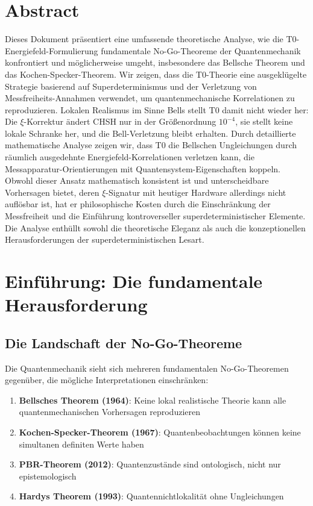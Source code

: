 \section*{Abstract}
		Dieses Dokument präsentiert eine umfassende theoretische Analyse, wie die T0-Energiefeld-Formulierung fundamentale No-Go-Theoreme der Quantenmechanik konfrontiert und möglicherweise umgeht, insbesondere das Bellsche Theorem und das Kochen-Specker-Theorem. Wir zeigen, dass die T0-Theorie eine ausgeklügelte Strategie basierend auf Superdeterminismus und der Verletzung von Messfreiheits-Annahmen verwendet, um quantenmechanische Korrelationen zu reproduzieren. Lokalen Realismus im Sinne Bells stellt T0 damit nicht wieder her: Die $\xi$-Korrektur ändert CHSH nur in der Größenordnung $10^{-4}$, sie stellt keine lokale Schranke her, und die Bell-Verletzung bleibt erhalten. Durch detaillierte mathematische Analyse zeigen wir, dass T0 die Bellschen Ungleichungen durch räumlich ausgedehnte Energiefeld-Korrelationen verletzen kann, die Messapparatur-Orientierungen mit Quantensystem-Eigenschaften koppeln. Obwohl dieser Ansatz mathematisch konsistent ist und unterscheidbare Vorhersagen bietet, deren $\xi$-Signatur mit heutiger Hardware allerdings nicht auflösbar ist, hat er philosophische Kosten durch die Einschränkung der Messfreiheit und die Einführung kontroverseller superdeterministischer Elemente. Die Analyse enthüllt sowohl die theoretische Eleganz als auch die konzeptionellen Herausforderungen der superdeterministischen Lesart.

	
	
	\section{Einführung: Die fundamentale Herausforderung}
	
	\subsection{Die Landschaft der No-Go-Theoreme}
	
	Die Quantenmechanik sieht sich mehreren fundamentalen No-Go-Theoremen gegenüber, die mögliche Interpretationen einschränken:
	
	\begin{enumerate}
		\item \textbf{Bellsches Theorem (1964)}: Keine lokal realistische Theorie kann alle quantenmechanischen Vorhersagen reproduzieren
		\item \textbf{Kochen-Specker-Theorem (1967)}: Quantenbeobachtungen können keine simultanen definiten Werte haben
		\item \textbf{PBR-Theorem (2012)}: Quantenzustände sind ontologisch, nicht nur epistemologisch
		\item \textbf{Hardys Theorem (1993)}: Quantennichtlokalität ohne Ungleichungen
	\end{enumerate}
	
